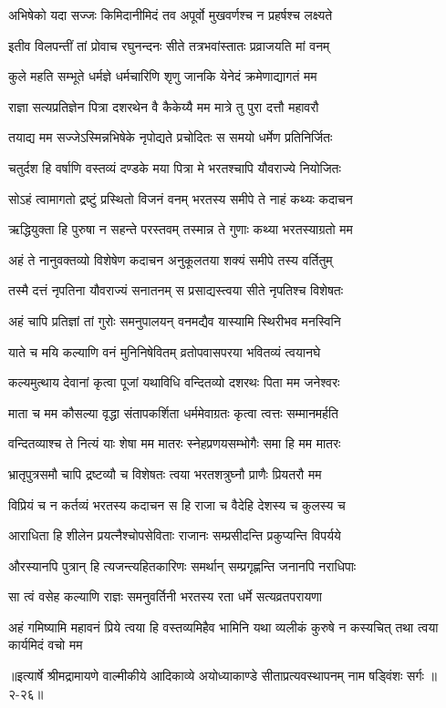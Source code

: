 \twolineshloka
{अभिषेको यदा सज्जः किमिदानीमिदं तव}
{अपूर्वो मुखवर्णश्च न प्रहर्षश्च लक्ष्यते} %

\twolineshloka
{इतीव विलपन्तीं तां प्रोवाच रघुनन्दनः}
{सीते तत्रभवांस्तातः प्रव्राजयति मां वनम्} %

\twolineshloka
{कुले महति सम्भूते धर्मज्ञे धर्मचारिणि}
{शृणु जानकि येनेदं क्रमेणाद्यागतं मम} %

\twolineshloka
{राज्ञा सत्यप्रतिज्ञेन पित्रा दशरथेन वै}
{कैकेय्यै मम मात्रे तु पुरा दत्तौ महावरौ} %

\twolineshloka
{तयाद्य मम सज्जेऽस्मिन्नभिषेके नृपोद्यते}
{प्रचोदितः स समयो धर्मेण प्रतिनिर्जितः} %

\twolineshloka
{चतुर्दश हि वर्षाणि वस्तव्यं दण्डके मया}
{पित्रा मे भरतश्चापि यौवराज्ये नियोजितः} %

\twolineshloka
{सोऽहं त्वामागतो द्रष्टुं प्रस्थितो विजनं वनम्}
{भरतस्य समीपे ते नाहं कथ्यः कदाचन} %

\twolineshloka
{ऋद्धियुक्ता हि पुरुषा न सहन्ते परस्तवम्}
{तस्मान्न ते गुणाः कथ्या भरतस्याग्रतो मम} %

\twolineshloka
{अहं ते नानुवक्तव्यो विशेषेण कदाचन}
{अनुकूलतया शक्यं समीपे तस्य वर्तितुम्} %

\twolineshloka
{तस्मै दत्तं नृपतिना यौवराज्यं सनातनम्}
{स प्रसाद्यस्त्वया सीते नृपतिश्च विशेषतः} %

\twolineshloka
{अहं चापि प्रतिज्ञां तां गुरोः समनुपालयन्}
{वनमद्यैव यास्यामि स्थिरीभव मनस्विनि} %

\twolineshloka
{याते च मयि कल्याणि वनं मुनिनिषेवितम्}
{व्रतोपवासपरया भवितव्यं त्वयानघे} %

\twolineshloka
{कल्यमुत्थाय देवानां कृत्वा पूजां यथाविधि}
{वन्दितव्यो दशरथः पिता मम जनेश्वरः} %

\twolineshloka
{माता च मम कौसल्या वृद्धा संतापकर्शिता}
{धर्ममेवाग्रतः कृत्वा त्वत्तः सम्मानमर्हति} %

\twolineshloka
{वन्दितव्याश्च ते नित्यं याः शेषा मम मातरः}
{स्नेहप्रणयसम्भोगैः समा हि मम मातरः} %

\twolineshloka
{भ्रातृपुत्रसमौ चापि द्रष्टव्यौ च विशेषतः}
{त्वया भरतशत्रुघ्नौ प्राणैः प्रियतरौ मम} %

\twolineshloka
{विप्रियं च न कर्तव्यं भरतस्य कदाचन}
{स हि राजा च वैदेहि देशस्य च कुलस्य च} %

\twolineshloka
{आराधिता हि शीलेन प्रयत्नैश्चोपसेविताः}
{राजानः सम्प्रसीदन्ति प्रकुप्यन्ति विपर्यये} %

\twolineshloka
{औरस्यानपि पुत्रान् हि त्यजन्त्यहितकारिणः}
{समर्थान् सम्प्रगृह्णन्ति जनानपि नराधिपाः} %

\twolineshloka
{सा त्वं वसेह कल्याणि राज्ञः समनुवर्तिनी}
{भरतस्य रता धर्मे सत्यव्रतपरायणा} %

\twolineshloka
{अहं गमिष्यामि महावनं प्रिये त्वया हि वस्तव्यमिहैव भामिनि}
{यथा व्यलीकं कुरुषे न कस्यचित् तथा त्वया कार्यमिदं वचो मम} %


॥इत्यार्षे श्रीमद्रामायणे वाल्मीकीये आदिकाव्ये अयोध्याकाण्डे सीताप्रत्यवस्थापनम् नाम षड्विंशः सर्गः ॥२-२६॥
